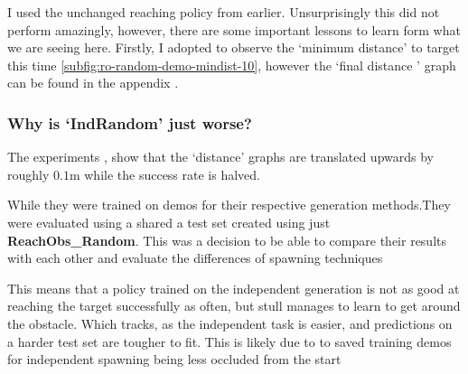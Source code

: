 I used the unchanged reaching policy from earlier. Unsurprisingly this did not perform amazingly, however, there are some important lessons to learn form what we are seeing here. Firstly, I adopted to observe the `minimum distance' to target this time \ref{subfig:ro-random-demo-mindist-10}, however the `final distance ' graph can be found in the appendix . 

\subsubsection{Why is `IndRandom' just worse?}
The experiments , show that the `distance' graphs are translated upwards by roughly $0.1$m while the success rate is halved.

While they were trained on demos for their respective generation methods.They were evaluated using a shared a test set created using just \textbf{ReachObs\_Random}. This was a decision to be able to compare their results with each other and evaluate the differences of spawning techniques

This means that a policy trained on the independent generation is not as good at reaching the target successfully as often, but stull manages to learn to get around the obstacle. Which tracks, as the independent task is easier, and predictions on a harder test set are tougher to fit.
This is likely due to to saved training demos for independent spawning being less occluded from the start 


